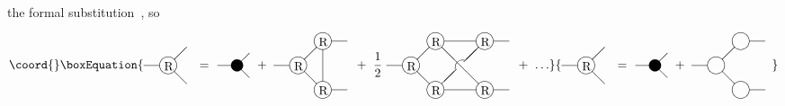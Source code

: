 \documentclass[a4paper,12pt]{article}
\begin{document}
the formal substitution \coordHE{}\,, so
\begin{equation}\coord{}\boxEquation{
\label{main}
\parbox{1.5cm}{
\begin{picture}(35,60)
\put(20,30){\circle{14}}
\put(0,30){\line(1,0){13}}
\put(25,35){\line(1,1){10}}
\put(25,25){\line(1,-1){10}}
\put(16.7,26){R}
\end{picture}
} =
\parbox{1.2cm}{
\begin{picture}(30,60)
\put(20,30){\circle*{10}}
\put(4,30){\line(1,0){15}}
\put(20,30){\line(1,1){10}}
\put(20,30){\line(1,-1){10}}
\end{picture}
} + \
\parbox{2.3cm}{
\begin{picture}(60,60)
\put(20,30){\circle{14}}
\put(40,10){\circle{14}}
\put(40,50){\circle{14}}
\put(0,30){\line(1,0){13}}
\put(47,50){\line(1,0){13}}
\put(47,10){\line(1,0){13}}
\put(25,35){\line(1,1){10}}
\put(25,25){\line(1,-1){10}}
\put(40,17){\line(0,1){26.5}}
\put(16.7,26){R}
\put(36.7,6){R}
\put(36.7,46){R}
\end{picture}
} + \ \frac{1}{2} \
\parbox{3.7cm}{
\begin{picture}(100,60)
\put(20,30){\circle{14}}
\put(40,10){\circle{14}}
\put(40,50){\circle{14}}
\put(80,10){\circle{14}}
\put(80,50){\circle{14}}
\put(87,50){\line(1,0){13}}
\put(87,10){\line(1,0){13}}
\put(0,30){\line(1,0){13}}
\put(47,50){\line(1,0){26}}
\put(47,10){\line(1,0){26}}
\put(25,35){\line(1,1){10}}
\put(25,25){\line(1,-1){10}}
\put(45,15){\line(1,1){12}}
\put(75,45){\line(-1,-1){12}}
\put(45,45){\line(1,-1){30}}
\put(63.5,27){\oval(15,15)[tl]}
\put(16.7,26){R}
\put(36.7,6){R}
\put(36.7,46){R}
\put(76.7,6){R}
\put(76.7,46){R}
\end{picture}
} + \ \ldots
}{
\parbox{1.5cm}{
\begin{picture}(35,60)
\put(20,30){\circle{14}}
\put(0,30){\line(1,0){13}}
\put(25,35){\line(1,1){10}}
\put(25,25){\line(1,-1){10}}
\put(16.7,26){R}
\end{picture}
} =
\parbox{1.2cm}{
\begin{picture}(30,60)
\put(20,30){\circle*{10}}
\put(4,30){\line(1,0){15}}
\put(20,30){\line(1,1){10}}
\put(20,30){\line(1,-1){10}}
\end{picture}
} + \
\parbox{2.3cm}{
\begin{picture}(60,60)
\put(20,30){\circle{14}}
\put(40,10){\circle{14}}
\put(40,50){\circle{14}}
\put(0,30){\line(1,0){13}}
\put(47,50){\line(1,0){13}}
\put(47,10){\line(1,0){13}}
\put(25,35){\line(1,1){10}}
\put(25,25){\line(1,-1){10}}

\end{picture}}}
\end{equation}
\end{document}
